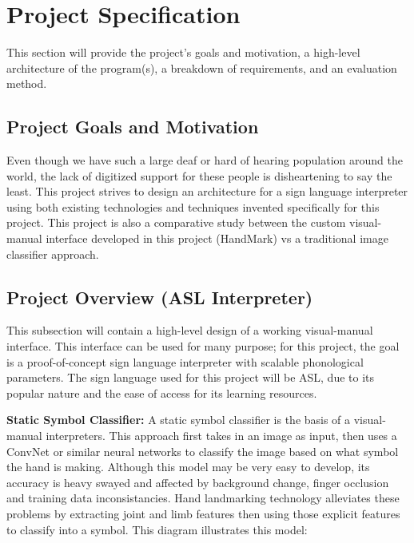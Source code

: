 \documentclass[11pt]{article}
\def\paraskip{\vskip 0.4cm}
\begin{document}
\section{Project Specification}
    This section will provide the project's goals and motivation, a high-level architecture of the program(s), a breakdown of requirements, and an evaluation method.

    \subsection{Project Goals and Motivation}
        Even though we have such a large deaf or hard of hearing population around the world, the lack of digitized support for these people is disheartening to say the least. This project strives to design an architecture for a sign language interpreter using both existing technologies and techniques invented specifically for this project. This project is also a comparative study between the custom visual-manual interface developed in this project (HandMark) vs a traditional image classifier approach.
    
    \subsection{Project Overview (ASL Interpreter)}
        This subsection will contain a high-level design of a working visual-manual interface. This interface can be used for many purpose; for this project, the goal is a proof-of-concept sign language interpreter with scalable phonological parameters. The sign language used for this project will be ASL, due to its popular nature and the ease of access for its learning resources. 

        \paraskip

        \noindent\textbf{Static Symbol Classifier: } A static symbol classifier is the basis of a visual-manual interpreters. This approach first takes in an image as input, then uses a ConvNet or similar neural networks to classify the image based on what symbol the hand is making. Although this model may be very easy to develop, its accuracy is heavy swayed and affected by background change, finger occlusion and training data inconsistancies. Hand landmarking technology alleviates these problems by extracting joint and limb features then using those explicit features to classify into a symbol. This diagram illustrates this model:
\end{document}

